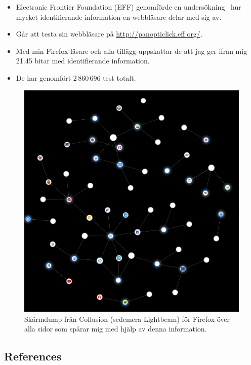 \documentclass{beamer}
\begin{document}
\begin{frame}
  \begin{itemize}
    \item Electronic Frontier Foundation (EFF) genomförde en 
      undersökning~\cite{Eckersley2010hui} hur mycket identifierande 
      information en webbläsare delar med sig av.

    \item Går att testa sin webbläsare på \url{http://panopticlick.eff.org/}.

    \item Med min Firefox-läsare och alla tillägg uppskattar de att jag ger 
      ifrån mig 21.45 bitar med identifierande information.

    \item De har genomfört 2\,860\,696 test totalt.

  \end{itemize}
\end{frame}

\begin{frame}
  \begin{figure}
    \includegraphics[height=0.7\textheight]{collusion.png}
    \caption{Skärmdump från Collusion (sedemera Lightbeam) för Firefox över 
    alla sidor som spårar mig med hjälp av denna information.}
  \end{figure}
\end{frame}



\subsection*{References}
\begin{frame}[allowframebreaks]
	\small
  \printbibliography{}
\end{frame}
\end{document}
